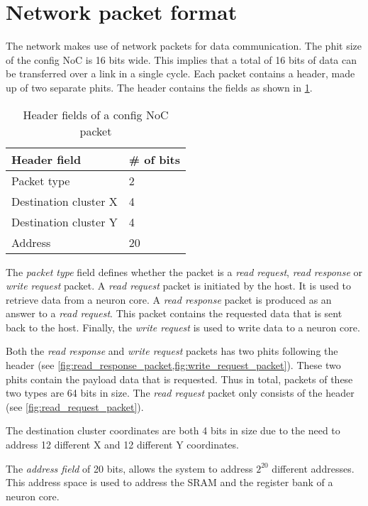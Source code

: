 \section{Network packet format}
The network makes use of network packets for data communication.
The phit size of the config NoC is 16 bits wide.
This implies that a total of 16 bits of data can be transferred over a link in a single cycle.
Each packet contains a header, made up of two separate phits.
The header contains the fields as shown in \cref{tab:header_fields}.

\begin{table}[hbtp]
\centering
\begin{tabular}{@{}ll@{}}
\toprule
\textbf{Header field} & \textbf{\# of bits} \\ \midrule
Packet type           & 2                   \\
Destination cluster X & 4                   \\
Destination cluster Y & 4                   \\
Address               & 20                  \\ \bottomrule
\end{tabular}
\caption{Header fields of a config NoC packet}
\label{tab:header_fields}
\end{table}

The \textit{packet type} field defines whether the packet is a \textit{read request}, \textit{read response} or \textit{write request} packet.
A \textit{read request} packet is initiated by the host.
It is used to retrieve data from a neuron core.
A \textit{read response} packet is produced as an answer to a \textit{read request}.
This packet contains the requested data that is sent back to the host.
Finally, the \textit{write request} is used to write data to a neuron core.

Both the \textit{read response} and \textit{write request} packets has two phits following the header (see \cref{fig:read_response_packet,fig:write_request_packet}).
These two phits contain the payload data that is requested.
Thus in total, packets of these two types are 64 bits in size.
The \textit{read request} packet only consists of the header (see \cref{fig:read_request_packet}).

The destination cluster coordinates are both 4 bits in size due to the need to address 12 different X and 12 different Y coordinates.

The \textit{address field} of 20 bits, allows the system to address $2^{20}$ different addresses.
This address space is used to address the SRAM and the register bank of a neuron core.

